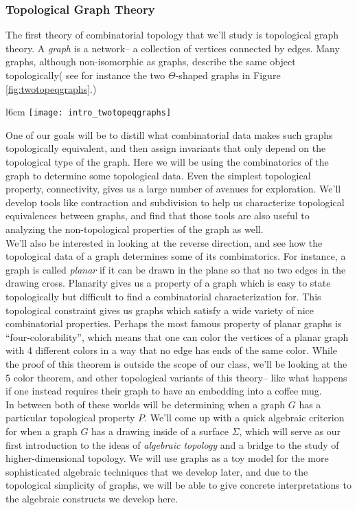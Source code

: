 \subsubsection{Topological Graph Theory}
The first theory of combinatorial topology  that we'll study is topological graph theory. A \emph{graph} is a network-- a collection of vertices connected by edges. Many graphs, although non-isomorphic as graphs, describe the same object topologically( see for instance the two $\Theta$-shaped graphs in  Figure \ref{fig:twotopeqgraphs}.) 
\begin{wrapfigure}{l}{6cm}
\centering
\texttt{[image: intro\_twotopeqgraphs]}
\caption{Non-isomorphic graphs which are topologically equivalent}
\label{fig:twotopeqgraphs}
\end{wrapfigure}
One of our goals will be to distill what combinatorial data makes such graphs topologically equivalent, and then assign invariants that only depend on  the topological type of the graph. Here we will be using the combinatorics of the graph to determine some topological data. Even the simplest topological property, connectivity, gives us a large number of avenues for exploration. We'll develop tools like contraction and subdivision to help us characterize topological equivalences between graphs, and find that those tools are also useful to analyzing the non-topological properties of the graph as well. \\
We'll also be interested in looking at the reverse  direction, and see how the topological data of a graph determines some of its combinatorics. For instance, a graph is called  \emph{planar} if it can be drawn in the plane so that no two edges in the drawing cross. Planarity gives us a property of a graph which is easy to state topologically but difficult to find a combinatorial characterization for. This topological constraint gives us graphs which satisfy a wide variety of nice combinatorial properties.  Perhaps the most famous property of planar graphs is ``four-colorability'', which means that one can color the vertices of a planar graph with 4 different colors in a way that no edge has ends of the same color. While the proof of this theorem is outside the scope of our class, we'll be looking at the 5 color theorem, and other topological variants of this theory-- like what happens if one instead requires their graph to have an embedding into a  coffee mug. \\
In between both of these worlds will be determining when a graph $G$ has a particular topological property $P$. We'll come up with a quick algebraic criterion for when a graph $G$ has a drawing inside of a surface $\Sigma$, which will serve as our first introduction to the ideas of \emph{algebraic topology} and a bridge to the study of higher-dimensional topology. We will use graphs as a toy model for the more sophisticated algebraic techniques that we develop later, and due to the topological simplicity of graphs, we will be able to give concrete interpretations to the algebraic constructs we develop here. 
